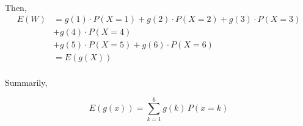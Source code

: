 \documentclass[letterpaper,12pt]{article}
\begin{document}
\paragraph{}Then,
\begin{align*}
    E(W) &= g(1) \cdot P(X=1) + g(2)\cdot P(X=2) + g(3)\cdot P(X=3)\\
         &+ g(4)\cdot P(X=4)\\
         &+ g(5) \cdot P(X=5) + g(6)\cdot P(X=6)\\
         &= E(g(X))
\end{align*}
\paragraph{}Summarily,

\[
    E(g(x)) = \sum_{k=1}^6 g(k)\,P(x=k)
\]
\end{document}
